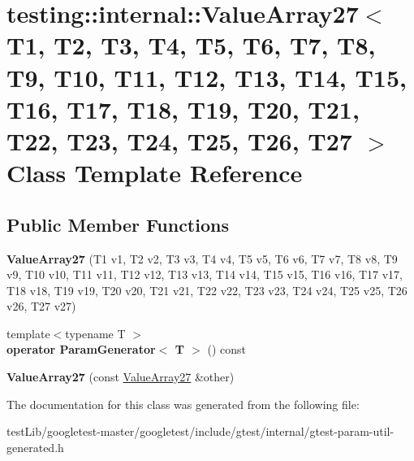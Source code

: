 \hypertarget{classtesting_1_1internal_1_1ValueArray27}{}\section{testing\+:\+:internal\+:\+:Value\+Array27$<$ T1, T2, T3, T4, T5, T6, T7, T8, T9, T10, T11, T12, T13, T14, T15, T16, T17, T18, T19, T20, T21, T22, T23, T24, T25, T26, T27 $>$ Class Template Reference}
\label{classtesting_1_1internal_1_1ValueArray27}
\subsection*{Public Member Functions}
\begin{DoxyCompactItemize}
\item 
\mbox{\label{classtesting_1_1internal_1_1ValueArray27_a17b34a604c556eef28039dc4c5d0343f}} 
{\bfseries Value\+Array27} (T1 v1, T2 v2, T3 v3, T4 v4, T5 v5, T6 v6, T7 v7, T8 v8, T9 v9, T10 v10, T11 v11, T12 v12, T13 v13, T14 v14, T15 v15, T16 v16, T17 v17, T18 v18, T19 v19, T20 v20, T21 v21, T22 v22, T23 v23, T24 v24, T25 v25, T26 v26, T27 v27)
\item 
\mbox{\label{classtesting_1_1internal_1_1ValueArray27_af120f76a65da981182ecfaa8846a10bd}} 
{\footnotesize template$<$typename T $>$ }\\{\bfseries operator Param\+Generator$<$ T $>$} () const
\item 
\mbox{\label{classtesting_1_1internal_1_1ValueArray27_a84702665e9f3180487c8061b2981202d}} 
{\bfseries Value\+Array27} (const \hyperlink{classtesting_1_1internal_1_1ValueArray27}{Value\+Array27} \&other)
\end{DoxyCompactItemize}


The documentation for this class was generated from the following file\+:\begin{DoxyCompactItemize}
\item 
test\+Lib/googletest-\/master/googletest/include/gtest/internal/gtest-\/param-\/util-\/generated.\+h\end{DoxyCompactItemize}
